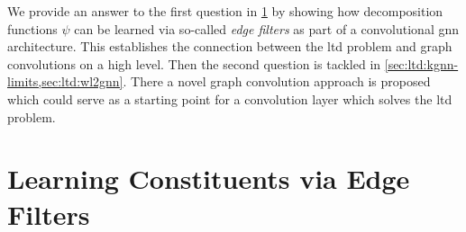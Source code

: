 We provide an answer to the first question in \cref{sec:ltd:edge-filter} by showing how decomposition functions $\psi$ can be learned via so-called \textit{edge filters} as part of a convolutional \ac{gnn} architecture.
This establishes the connection between the \acs{ltd} problem and graph convolutions on a high level.
Then the second question is tackled in \cref{sec:ltd:kgnn-limits,sec:ltd:wl2gnn}.
There a novel graph convolution approach is proposed which could serve as a starting point for a convolution layer which solves the \ac{ltd} problem.

\section{Learning Constituents via Edge Filters}%
\label{sec:ltd:edge-filter}

